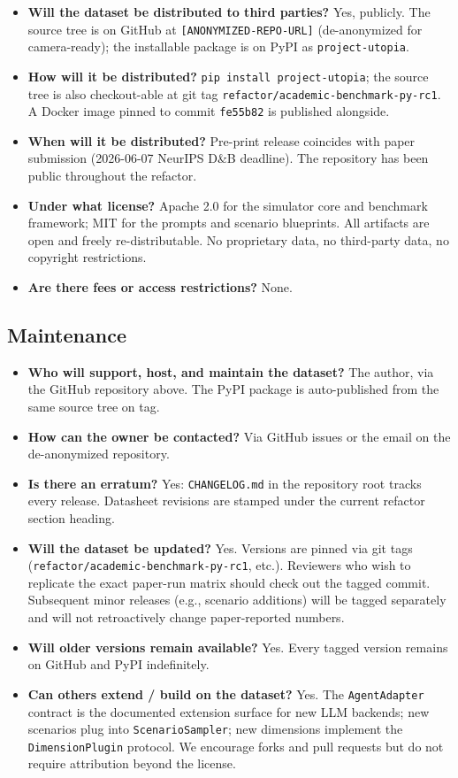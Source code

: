 \begin{itemize}[leftmargin=*]
\item \textbf{Will the dataset be distributed to third parties?}
Yes, publicly. The source tree is on GitHub at
\texttt{[ANONYMIZED-REPO-URL]} (de-anonymized for camera-ready);
the installable package is on PyPI as \texttt{project-utopia}.
\item \textbf{How will it be distributed?}
\texttt{pip install project-utopia}; the source tree is also
checkout-able at git tag
\texttt{refactor/academic-benchmark-py-rc1}. A Docker image
pinned to commit \texttt{fe55b82} is published alongside.
\item \textbf{When will it be distributed?}
Pre-print release coincides with paper submission
(2026-06-07 NeurIPS D\&B deadline). The repository has been
public throughout the refactor.
\item \textbf{Under what license?}
Apache 2.0 for the simulator core and benchmark framework;
MIT for the prompts and scenario blueprints. All artifacts
are open and freely re-distributable. No proprietary data,
no third-party data, no copyright restrictions.
\item \textbf{Are there fees or access restrictions?}
None.
\end{itemize}

\subsection{Maintenance}

\begin{itemize}[leftmargin=*]
\item \textbf{Who will support, host, and maintain the dataset?}
The author, via the GitHub repository above. The PyPI
package is auto-published from the same source tree on tag.
\item \textbf{How can the owner be contacted?}
Via GitHub issues or the email on the de-anonymized
repository.
\item \textbf{Is there an erratum?}
Yes: \texttt{CHANGELOG.md} in the repository root tracks
every release. Datasheet revisions are stamped under the
current refactor section heading.
\item \textbf{Will the dataset be updated?}
Yes. Versions are pinned via git tags
(\texttt{refactor/academic-benchmark-py-rc1}, etc.). Reviewers
who wish to replicate the exact paper-run matrix should
check out the tagged commit. Subsequent minor releases
(e.g., scenario additions) will be tagged separately and
will not retroactively change paper-reported numbers.
\item \textbf{Will older versions remain available?}
Yes. Every tagged version remains on GitHub and PyPI
indefinitely.
\item \textbf{Can others extend / build on the dataset?}
Yes. The \texttt{AgentAdapter} contract is the documented
extension surface for new LLM backends; new scenarios
plug into \texttt{ScenarioSampler}; new dimensions
implement the \texttt{DimensionPlugin} protocol. We
encourage forks and pull requests but do not require
attribution beyond the license.
\end{itemize}
